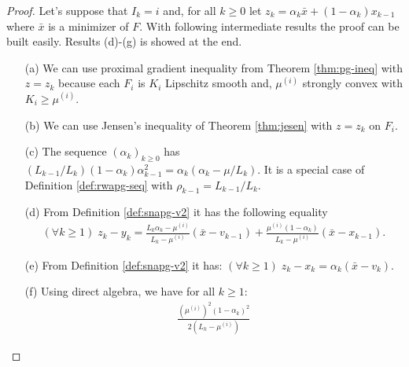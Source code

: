 \documentclass[12pt]{article}
\begin{document}
        \begin{lemma}
            
        \end{lemma}

        \begin{theorem}\label{thm:snapg2-one-step}
            
        \end{theorem}
        \begin{proof}
            Let's suppose that $I_k = i$ and, for all $k \ge 0$ let $z_k = \alpha_k \bar x + (1 - \alpha_k)x_{k - 1}$ where $\bar x$ is a minimizer of $F$. 
            With following intermediate results the proof can be built easily. 
            Results (d)-(g) is showed at the end. 
            \begin{itemize}
                \item[(a)] We can use proximal gradient inequality from Theorem \ref{thm:pg-ineq} with $z = z_k$ because each $F_i$ is $K_i$ Lipschitz smooth and, $\mu^{(i)}$ strongly convex with $K_i \ge \mu^{(i)}$. 
                \item[(b)] We can use Jensen's inequality of Theorem \ref{thm:jesen} with $z = z_k$ on $F_i$. 
                \item[(c)] The sequence $(\alpha_k)_{k \ge 0}$ has $(L_{k - 1}/L_k)(1 - \alpha_{k})\alpha_{k - 1}^2 = \alpha_{k}\left(\alpha_{k} - \mu/L_k\right)$. It is a special case of Definition \ref{def:rwapg-seq} with $\rho_{k - 1} = L_{k - 1}/L_k$. 
                \item[(d)] From Definition \ref{def:snapg-v2} it has the following equality 
                \begin{align*}
                    (\forall k \ge 1)\; 
                    z_k - y_k 
                    = 
                    \frac{L_k\alpha_k - \mu^{(i)}}{L_k - \mu^{(i)}}(\bar x - v_{k - 1})
                    + \frac{\mu^{(i)}(1 - \alpha_k)}{L_k - \mu^{(i)}}(\bar x - x_{k - 1}).
                \end{align*}
                \item [(e)] From Definition \ref{def:snapg-v2} it has: $(\forall k \ge 1)\; z_k - x_k = \alpha_k (\bar x - v_k)$. 
                \item [(f)] Using direct algebra, we have for all $k \ge 1$: 
                \begin{align*}
                    \frac{\left(\mu^{(i)}\right)^2(1 - \alpha_k)^2}{2(L_k - \mu^{(i)})} 

\end{align*}
\end{itemize}
\end{proof}
\end{document}
